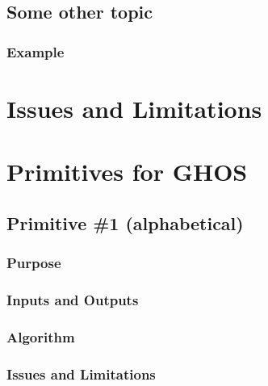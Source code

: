 \documentclass[letterpaper,10pt,english]{sphinxmanual}
\begin{document}
\subsection{Some other topic}
\label{GHOS/tipstricks:some-other-topic}

\subsubsection{Example}
\label{GHOS/tipstricks:id1}

\section{Issues and Limitations}
\label{GHOS/issueslimitations:ghos-issues-limitations}\label{GHOS/issueslimitations::doc}\label{GHOS/issueslimitations:issues-and-limitations}

\section{Primitives for GHOS}
\label{GHOS/primitives:ghos-primitives}\label{GHOS/primitives::doc}\label{GHOS/primitives:primitives-for-ghos}

\subsection{Primitive \#1  (alphabetical)}
\label{GHOS/primitives_pages/primitive1:primitive-1-alphabetical}\label{GHOS/primitives_pages/primitive1:ghos-primitive-1}\label{GHOS/primitives_pages/primitive1::doc}

\subsubsection{Purpose}
\label{GHOS/primitives_pages/primitive1:purpose}

\subsubsection{Inputs and Outputs}
\label{GHOS/primitives_pages/primitive1:inputs-and-outputs}

\subsubsection{Algorithm}
\label{GHOS/primitives_pages/primitive1:algorithm}

\subsubsection{Issues and Limitations}
\label{GHOS/primitives_pages/primitive1:issues-and-limitations}
\end{document}
